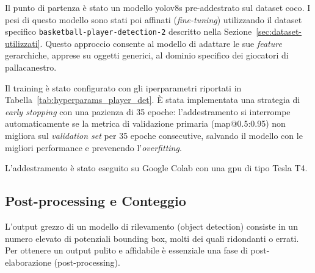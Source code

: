 \documentclass[12pt,a4paper,openright,twoside]{book}
\begin{document}
Il punto di partenza è stato un modello \ac{yolo}v8s pre-addestrato sul dataset \ac{coco}. I pesi di questo modello sono stati poi affinati 
(\emph{fine-tuning}) utilizzando il dataset specifico \texttt{basketball-player-detection-2} descritto nella Sezione~\ref{sec:dataset-utilizzati}. 
Questo approccio consente al modello di adattare le sue \emph{feature} gerarchiche, apprese su oggetti generici, al dominio specifico dei giocatori 
di pallacanestro.

Il training è stato configurato con gli iperparametri riportati in Tabella~\ref{tab:hyperparams_player_det}.
È stata implementata una strategia di \emph{early stopping} con una pazienza di 35 epoche: l'addestramento si interrompe automaticamente se 
la metrica di validazione primaria (\ac{map}@0.5:0.95) non migliora sul \emph{validation set} per 35 epoche consecutive, salvando il modello con 
le migliori performance e prevenendo l'\emph{overfitting}.

\begin{table}[h]
  \centering
  \caption{Iperparametri utilizzati per l'addestramento del modello \ac{yolo}v8s per il rilevamento dei giocatori. La scelta di un \emph{batch size} 
  relativamente piccolo è dovuta ai limiti di memoria della \ac{gpu} utilizzata.}
  \label{tab:hyperparams_player_det}
\end{table}

\noindent L'addestramento è stato eseguito su Google Colab con una \ac{gpu} di tipo Tesla T4.

\subsection{Post-processing e Conteggio}
\label{subsec:post-processing-conteggio}

L'output grezzo di un modello di rilevamento (object detection) consiste in un numero elevato di potenziali bounding box, molti dei quali 
ridondanti o errati. Per ottenere un output pulito e affidabile è essenziale una fase di post-elaborazione (post-processing).
\end{document}
